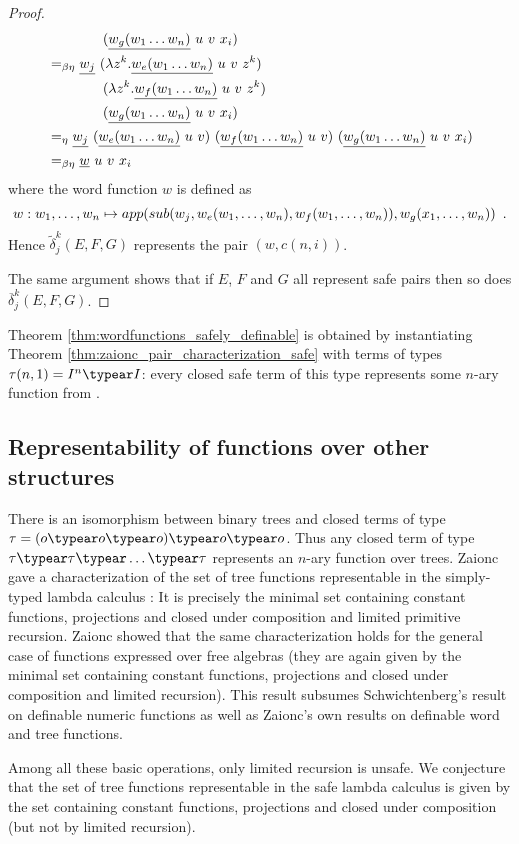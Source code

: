 \begin{proof}
\begin{alignat*}{2}
       & \qquad\qquad  (\zaioncencode{w_g(w_1\ldots w_n)}~u~v~x_i)\\
%
   &=_{\beta\eta} \zaioncencode{w_j}\  (\lambda z^k. \zaioncencode{w_e(w_1\ldots w_n)}~u~v~z^k) \\
       & \qquad\qquad (\lambda z^k. \zaioncencode{w_f(w_1\ldots w_n)}~u~v~z^k) \\
       & \qquad\qquad (\zaioncencode{w_g(w_1\ldots w_n)}~u~v~x_i)\\
%
   &=_\eta \zaioncencode{w_j}\  (\zaioncencode{w_e(w_1\ldots w_n)}~u~v)  \ (\zaioncencode{w_f(w_1\ldots w_n)}~u~v) \  (\zaioncencode{w_g(w_1\ldots w_n)}~u~v~x_i)\\
%
   &=_{\beta\eta}  \zaioncencode{w}~u~v~ x_i
 \end{alignat*}
where the word function $w$ is defined as
$$w: w_1,\ldots,w_n \mapsto \mathop{app}(\mathop{sub}(w_j,w_e(w_1,\ldots,w_n),w_f(w_1,\ldots,w_n)),w_g(x_1,\ldots,w_n)) \enspace .$$
  Hence $\widetilde \delta^k_j (E,F,G)$ represents the pair $(w,c(n,i))$.

  The same argument shows that if $E$, $F$ and $G$ all represent safe pairs
then so does $\overline \delta^k_j (E,F,G)$.
\end{proof}


Theorem \ref{thm:wordfunctions_safely_definable} is obtained by
instantiating Theorem \ref{thm:zaionc_pair_characterization_safe}
with terms of types $\tau(n,1) = I^n\typear I$: every
closed safe term of this type represents some $n$-ary function from
\safedefset.

\subsection{Representability of functions over other structures}\hfill

There is an isomorphism between binary trees and closed terms of
type $\tau =(o\typear o\typear o) \typear o \typear o$. Thus any
closed term of type $\tau\typear\tau \typear \ldots \typear \tau $
represents an $n$-ary function over trees. Zaionc gave a
characterization of the set of tree functions representable in the
simply-typed lambda calculus \cite{DBLP:conf/aluacs/Zaionc88}: It is
precisely the minimal set containing constant functions, projections
and closed under composition and limited primitive recursion. Zaionc
showed that the same characterization holds for the general case of
functions expressed over free algebras
\cite{DBLP:journals/apal/Zaionc91} (they are again given by the
minimal set containing constant functions, projections and closed
under composition and limited recursion). This result subsumes
Schwichtenberg's result on definable numeric functions as well as
Zaionc's own results on definable word and tree functions.

Among all these basic operations, only limited recursion is unsafe.
We conjecture that the set of tree functions representable in the
safe lambda calculus is given by the set containing constant
functions, projections and closed under composition (but not by
limited recursion).
